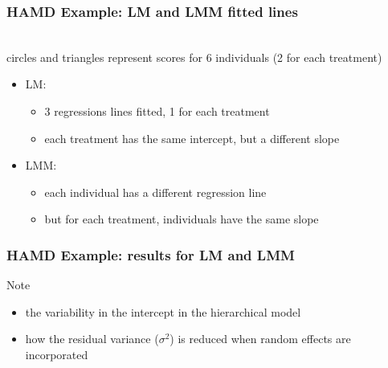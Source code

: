 \documentclass{beamer}
\begin{document}
\begin{frame}
    \frametitle{HAMD Example: LM and LMM fitted lines}
    \vspace{-2mm}
    \begin{center}
        \\\vspace{-2mm}
        \footnotesize circles and triangles represent scores for 6 individuals (2 for each treatment) \normalsize
    \end{center}
    \begin{itemize}\vspace{-2mm}\small
        \item LM:
        \begin{itemize}
            \item 3 regressions lines fitted, 1 for each treatment
            \item each treatment has the same intercept, but a different slope
        \end{itemize}\vspace{1mm}
        \item LMM:
        \begin{itemize}
            \item each individual has a different regression line
            \item but for each treatment, individuals have the same slope
        \end{itemize}
    \end{itemize}
    \normalsize
\end{frame}

\begin{frame}
    \frametitle{HAMD Example: results for LM and LMM}
    \vspace{-5mm}
    \renewcommand{\arraystretch}{1.3}
    
    \renewcommand{\arraystretch}{1}
    Note
    \begin{itemize}
        \item the variability in the intercept in the hierarchical model
        \item how the residual variance ($\sigma^2$) is reduced when random effects are incorporated
    \end{itemize}
    \vspace{-2mm}
\end{frame}
\end{document}
